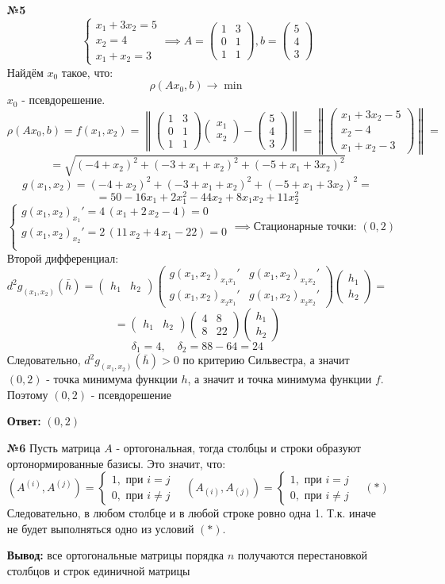 \documentclass[a4paper]{article}
\newcommand{\mat}[1]{\begin{pmatrix} #1 \end{pmatrix}}
\newcommand{\case}[1]{\begin{cases} #1 \end{cases}}
\begin{document}
\begin{enumerate}
    \item[\textbf{№5}]
    $$\case{
        x_1 + 3x_2 = 5\\
        x_2 = 4\\
        x_1+x_2 = 3
    }\implies A = \mat{1 & 3 \\ 0 & 1 \\ 1 & 1}, b = \mat{5 \\ 4\\3}$$
    Найдём $x_0$ такое, что: 
    $$\rho(Ax_0, b) \to \min$$
    $x_0$ - псевдорешение.
    $$\rho(Ax_0, b) = f(x_1, x_2) = \left\| \mat{1 & 3 \\ 0 & 1 \\ 1 & 1}\mat{x_1\\ x_2}-\mat{5\\4\\3} \right\|= 
    \left\|\mat{x_1+3x_2-5\\x_2-4\\x_1+x_2-3}\right\| =$$
    $$=\sqrt{(-4 + x_2)^2 + (-3 + x_1 + x_2)^2 + (-5 + x_1 + 3x_2)^2}$$
    $$g(x_1, x_2) =(-4 + x_2)^2 + (-3 + x_1 + x_2)^2 + (-5 + x_1 + 3x_2)^2=$$
    $$= 50 - 16x_1 + 2x_1^2 - 44x_2 + 8x_1x_2 + 11x_2^2 $$
    $$\case{
        g(x_1, x_2)_{x_1}'=4\,\left(x_{1}+2\,x_{2}-4\right) = 0\\
        g(x_1, x_2)_{x_2}'= 2\,\left(11\,x_{2}+4\,x_{1}-22\right) =0\\
    } \implies \text{Стационарные точки: } (0, 2)$$
    Второй дифференциал:
    $$d^2g_{(x_1, x_2)}(\bar{h}) = \mat{h_1 & h_2}
     \mat{g(x_1, x_2)_{x_1x_1}' & g(x_1, x_2)_{x_1x_2}'\\
     g(x_1, x_2)_{x_2x_1}' & g(x_1, x_2)_{x_2x_2}'} \mat{h_1\\h_2} = $$
    $$=\mat{h_1 & h_2}
    \mat{4 & 8\\
    8 & 22} \mat{h_1\\h_2}$$
    $$\delta_1 = 4, \quad \delta_2 = 88-64=24$$
    Следовательно, $d^2g_{(x_1, x_2)}(\bar{h}) >0 $ по критерию Сильвестра, а значит $(0, 2)$ - точка минимума функции $h$, а значит и точка минимума функции $f$. Поэтому $(0, 2)$ - псевдорешение
    
    \textbf{Ответ: } $(0, 2)$\\


    \item[\textbf{№6}]Пусть матрица $A$ - ортогональная, тогда столбцы и строки
     образуют ортонормированные базисы. Это значит, что:
     $$(A^{(i)}, A^{(j)}) = \case{
        1, \text{ при } i=j\\
        0, \text{ при } i\neq j
     } \quad (A_{(i)}, A_{(j)}) = \case{
        1, \text{ при } i=j\\
        0, \text{ при } i\neq j
     } \quad (*)$$
     Следовательно, в любом столбце и в любой строке ровно одна 1. 
     Т.к. иначе не будет выполняться одно из условий $(*)$.
     
     \textbf{Вывод: } все ортогональные матрицы порядка $n$ получаются перестановкой столбцов и строк единичной матрицы
    
\end{enumerate}
\end{document}
